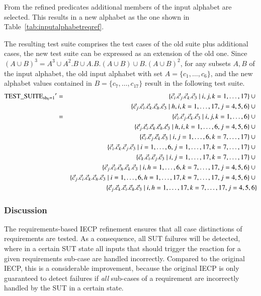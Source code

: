 \begin{example}
From the refined predicates additional members of the input alphabet are selected. This results
in a new alphabet as the one shown in Table~\ref{tab:inputalphabetreqref}.

The resulting test suite comprises the test cases of the old suite plus additional cases, 
the new test suite can be expressed as an extension of the old one.
Since $(A\cup B)^3=A^3\cup A^2.B\cup A.B.(A\cup B)\cup B.(A\cup B)^2$, for any subsets $A,B$ of the input alphabet, the old input alphabet with set $A=\{c_1,\dots,c_6\}$, and the new alphabet values 
contained in $B=\{c_7,\dots,c_{17}\}$   result in the following test suite.
\footnotesize
\begin{eqnarray*}
{\text{TEST\_SUITE}_{\text{sb}_0=1}}' & = & 
\{\vec c_i.\vec c_j.\vec c_k.\vec c_3~|~i,j,k=1,\dots,17\} \cup{}
\\ & &
\{\vec c_j.\vec c_i.\vec c_k.\vec c_h.\vec c_3~|~h,i,k=1,\dots,17,j = 4,5,6 \} \cup {}
\\
& = &
\{\vec c_i.\vec c_j.\vec c_k.\vec c_3~|~i,j,k=1,\dots,6\} \cup{}
\\ & &
\{\vec c_j.\vec c_i.\vec c_k.\vec c_h.\vec c_3~|~h,i,k=1,\dots,6,j = 4,5,6 \} \cup {}
\\ & & 
\{\vec c_i.\vec c_j.\vec c_k.\vec c_3~|~i,j=1,\dots,6, k=7,\dots,17\} \cup{}
\\ & &
\{\vec c_i.\vec c_k.\vec c_j.\vec c_3~|~i=1,\dots,6, j=1,\dots,17, k=7,\dots,17\} \cup{}
\\ & &
\{\vec c_k.\vec c_i.\vec c_j.\vec c_3~|~i,j=1,\dots,17, k=7,\dots,17\} \cup{}
\\ & &
\{\vec c_j.\vec c_i.\vec c_h.\vec c_k.\vec c_3~|~i,h=1,\dots,6, k=7,\dots,17,j = 4,5,6 \} \cup {}
\\ & & 
\{\vec c_j.\vec c_i.\vec c_k.\vec c_h.\vec c_3~|~i=1,\dots,6, h=1,\dots,17,  k=7,\dots,17,j = 4,5,6 \} \cup {}
\\ & & 
\{\vec c_j.\vec c_k.\vec c_i.\vec c_h.\vec c_3~|~i,h=1,\dots,17, k=7,\dots,17, j = 4,5,6\}
\end{eqnarray*}
\xbox
\end{example}
\subsubsection{Discussion}

The requirements-based IECP refinement ensures that all case distinctions of requirements are tested. As a consequence, all SUT failures will be detected, where in a certain SUT state all inputs that should trigger the reaction for a given requirements sub-case are handled incorrectly. Compared to the original IECP, this is a considerable improvement, because the original IECP is only guaranteed to detect failures if {\it all} sub-cases of a requirement are incorrectly handled by the SUT in a certain state.

